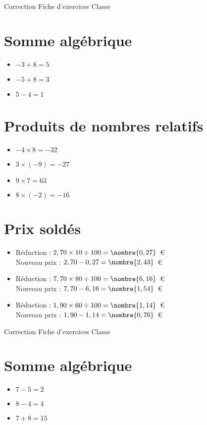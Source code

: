 \documentclass[a4paper,11pt,fleqn]{article}
\begin{document}
\pagestyle{empty}


{Correction} \hfill {\huge Fiche d'exercices } \hfill {Classe}

\section{Somme algébrique}
\begin{itemize}

  \item $-3 +8=5$
  \item $-5 +8=3$
  \item $5 -4=1$
\end{itemize}

\section{Produits de nombres relatifs}
\begin{itemize}

  \item $-4\times8=-32$
  \item $3\times(-9)=-27$
  \item $9\times7=63$
  \item $8\times(-2)=-16$
\end{itemize}

\section{Prix soldés}
\begin{itemize}

  \item Réduction : $2,70\times10\div100=\nombre{0,27}$~€\\
  Nouveau prix : $2,70-0,27=\nombre{2,43}$~€
  \item Réduction : $7,70\times80\div100=\nombre{6,16}$~€\\
  Nouveau prix : $7,70-6,16=\nombre{1,54}$~€
  \item Réduction : $1,90\times60\div100=\nombre{1,14}$~€\\
  Nouveau prix : $1,90-1,14=\nombre{0,76}$~€
\end{itemize}
\newpage
\setcounter{exo}{0}
\setcounter{section}{0}
{Correction} \hfill {\huge Fiche d'exercices } \hfill {Classe}

\section{Somme algébrique}
\begin{itemize}

  \item $7 -5=2$
  \item $8 -4=4$
  \item $7 +8=15$
\end{itemize}
\end{document}
